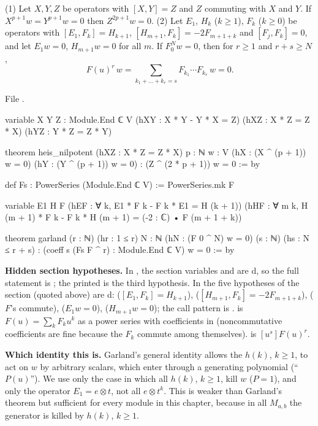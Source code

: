 \begin{theorem}[Heisenberg nilpotency; Garland's identity with $P(u)=1$]\label{l26:thm:garland}
(1) Let $X,Y,Z$ be operators with $[X,Y]=Z$ and $Z$ commuting with $X$ and $Y$. If $X^{p+1}w=Y^{p+1}w=0$ then
$Z^{2p+1}w=0$. (2) Let $E_1$, $H_k$ ($k\ge1$), $F_k$ ($k\ge0$) be operators with $[E_1,F_k]=H_{k+1}$,
$[H_{m+1},F_k]=-2F_{m+1+k}$ and $[F_j,F_k]=0$, and let $E_1w=0$, $H_{m+1}w=0$ for all $m$. If $F_0^Nw=0$, then for
$r\ge1$ and $r+s\ge N$,
\begin{equation*}
[u^s]\,F(u)^r\,w=\sum_{k_1+\dots+k_r=s}F_{k_1}\cdots F_{k_r}\,w=0 .
\end{equation*}
\end{theorem}
\noindent File .
\begin{leancode}
variable {X Y Z : Module.End ℂ V} (hXY : X * Y - Y * X = Z) (hXZ : X * Z = Z * X)
  (hYZ : Y * Z = Z * Y)

theorem heis_nilpotent (hXZ : X * Z = Z * X) {p : ℕ} {w : V} (hX : (X ^ (p + 1)) w = 0)
    (hY : (Y ^ (p + 1)) w = 0) : (Z ^ (2 * p + 1)) w = 0 := by

def Fs : PowerSeries (Module.End ℂ V) := PowerSeries.mk F


variable {E1 H F} (hEF : ∀ k, E1 * F k - F k * E1 = H (k + 1))
  (hHF : ∀ m k, H (m + 1) * F k - F k * H (m + 1) = (-2 : ℂ) • F (m + 1 + k))

theorem garland (r : ℕ) (hr : 1 ≤ r) {N : ℕ} (hN : (F 0 ^ N) w = 0) (s : ℕ) (hs : N ≤ r + s) :
    (coeff s (Fs F ^ r) : Module.End ℂ V) w = 0 := by
\end{leancode}

\begin{dictionary}
\textbf{Hidden section hypotheses.} In , the section variables  and
 are d, so the full statement is
; the printed  is the third hypothesis. In  the five
hypotheses of the section  (quoted above) are d:  ($[E_1,F_k]=H_{k+1}$), 
($[H_{m+1},F_k]=-2F_{m+1+k}$),  ($F$'s commute),  ($E_1w=0$),  ($H_{m+1}w=0$); the call
pattern is .  is $F(u)=\sum_kF_ku^k$ as a power series with
coefficients in  (noncommutative coefficients are fine because the $F_k$ commute among themselves).
 is $[u^s]F(u)^r$.

\textbf{Which identity this is.} Garland's general identity allows the $h(k)$, $k\ge1$, to act on $w$ by arbitrary scalars,
which enter through a generating polynomial (``$P(u)$''). We use only the case in which all $h(k)$, $k\ge1$, kill $w$ ($P=1$),
and only the operator $E_1=e\otimes t$, not all $e\otimes t^k$. This is weaker than Garland's theorem but sufficient for every
module in this chapter, because in all $M_{a,b}$ the generator is killed by $h(k)$, $k\ge1$.
\end{dictionary}

